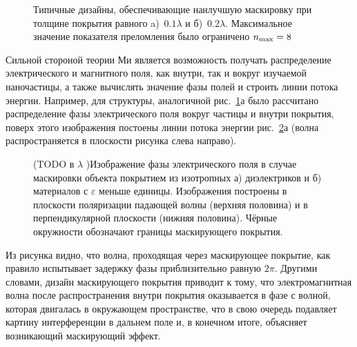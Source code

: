 \begin{figure}[t]
  \begin{minipage}[ht]{0.49\linewidth}
  \end{minipage}
  \hfill
  \begin{minipage}[ht]{0.49\linewidth}
  \end{minipage}
  \caption{Типичные дизайны, обеспечивающие наилучшую маскировку при
    толщине покрытия равного a)~$0.1\lambda$ и б)~$0.2\lambda$. Максимальное значение
    показателя преломления было ограничено $n_{\rm max}=8$}
  \label{img:designs}  
\end{figure}

Сильной стороной теории Ми является возможность получать распределение
электрического и магнитного поля, как внутри, так и вокруг изучаемой
наночастицы, а также вычислять значение фазы полей и строить линии
потока энергии.  Например, для структуры, аналогичной
рис.~\ref{img:designs}а было рассчитано распределение фазы
электрического поля вокруг частицы и внутри покрытия, поверх этого
изображения постоены линии потока энергии рис.~\ref{img:field-phase}а
(волна распространяется в плоскости рисунка слева направо).
\begin{figure}[t!]
  \begin{minipage}[ht]{0.49\linewidth}
  \end{minipage}
  \hfill
  \begin{minipage}[ht]{0.49\linewidth}
  \end{minipage}
  \caption{(TODO в $\lambda$ )Изображение фазы электрического поля в
    случае маскировки объекта покрытием из изотропных а) диэлектриков
    и б) материалов с $\varepsilon$ меньше единицы. Изображения
    построены в плоскости поляризации падающей волны (верхняя
    половина) и в перпендикулярной плоскости (нижняя половина). Чёрные
    окружности обозначают границы маскирующего покрытия.}
  \label{img:field-phase}  
\end{figure}
Из рисунка видно, что волна, проходящая через маскирующее покрытие,
как правило испытывает задержку фазы приблизительно равную
$2\pi$. Другими словами, дизайн маскирующего покрытия приводит к тому,
что электромагнитная волна после распространения внутри покрытия
оказывается в фазе с волной, которая двигалась в окружающем
пространстве, что в свою очередь подавляет картину интерференции в
дальнем поле и, в конечном итоге, объясняет возникающий маскирующий
эффект.

